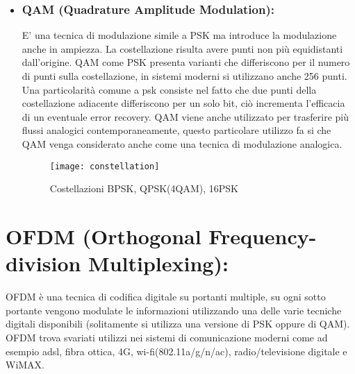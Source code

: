 \begin{itemize}
  \item \subsection{QAM (Quadrature Amplitude Modulation): } E' una tecnica di modulazione simile a PSK ma introduce la modulazione anche in ampiezza. La costellazione risulta avere punti non più equidistanti dall'origine. QAM come PSK presenta varianti che differiscono per il numero di punti sulla costellazione, in sistemi moderni si utilizzano anche 256 punti. Una particolarità comune a psk consiste nel fatto che due punti della costellazione adiacente differiscono per un solo bit, ciò incrementa l'efficacia di un eventuale error recovery. QAM viene anche utilizzato per trasferire più flussi analogici contemporaneamente, questo particolare utilizzo fa si che QAM venga considerato anche come una tecnica di modulazione analogica. 
  \cite{qam}
  
  \begin{figure}[h]
	\centering
	\texttt{[image: constellation]}
	\caption{Costellazioni BPSK, QPSK(4QAM), 16PSK \cite{psk-constellation}}\label{fig:1}
  \end{figure} 
  \end{itemize}
\newpage

\chapter{OFDM (Orthogonal Frequency-division Multiplexing): }
OFDM è una tecnica di codifica digitale su portanti multiple, su ogni sotto portante vengono modulate le informazioni utilizzando una delle varie tecniche digitali disponibili (solitamente si utilizza una versione di PSK oppure di QAM). OFDM trova svariati utilizzi nei sistemi di comunicazione moderni come ad esempio adsl, fibra ottica, 4G, wi-fi(802.11a/g/n/ac), radio/televisione digitale e WiMAX.
\cite{ofdm}
\cite{ofdm2}

\label{sec:problem}
